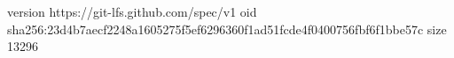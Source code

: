 version https://git-lfs.github.com/spec/v1
oid sha256:23d4b7aecf2248a1605275f5ef6296360f1ad51fcde4f0400756fbf6f1bbe57c
size 13296

